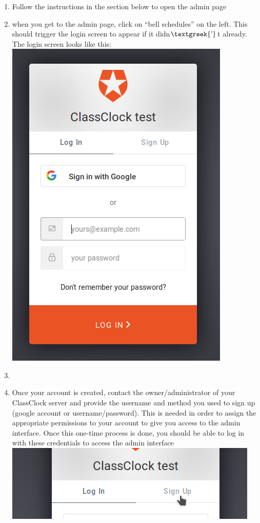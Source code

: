 \documentclass{article}
\begin{document}
\begin{enumerate}
\item {Follow the instructions in the section below to open the admin page}
\item {when you get to the admin page, click on “bell schedules” on the left. This should trigger the login screen to appear if
it didn$\text{\textgreek{’}}$t already. The login screen looks like this:\newline
}
\includegraphics[width=4.2181in,height=6.322in]{Mini20Manual-img005.png}
\item {}
\item {Once your account is created, contact the owner/administrator of your ClassClock server and provide the username and
method you used to sign up (google account or username/password). This is needed in order to assign the appropriate
permissions to your account to give you access to the admin interface. Once this one-time process is done, you should
be able to log in with these credentials to access the admin interface}
\includegraphics[width=4.7701in,height=1.4366in]{Mini20Manual-img006.png}
\end{enumerate}
\end{document}

